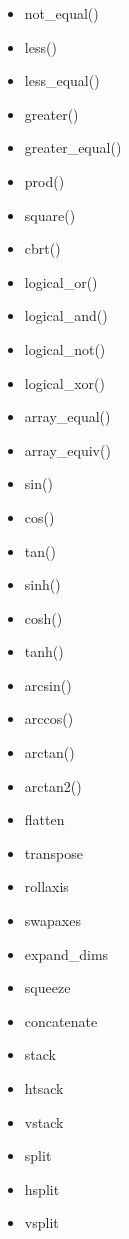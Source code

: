 \documentclass{article}
\begin{document}
\begin{itemize}
  \item not\_equal()
  \item less()
  \item less\_equal()
  \item greater()
  \item greater\_equal()
  \item prod()
  \item square()
  \item cbrt()
  \item logical\_or()
  \item logical\_and()
  \item logical\_not()
  \item logical\_xor()
  \item array\_equal()
  \item array\_equiv()
  \item sin()
  \item cos()
  \item tan()
  \item sinh()
  \item cosh()
  \item tanh()
  \item arcsin()
  \item arccos()
  \item arctan()
  \item arctan2()
  \item flatten
  \item transpose
  \item rollaxis
  \item swapaxes
  \item expand\_dims
  \item squeeze
  \item concatenate
  \item stack
  \item htsack
  \item vstack
  \item split
  \item hsplit
  \item vsplit
\end{itemize}
\end{document}
